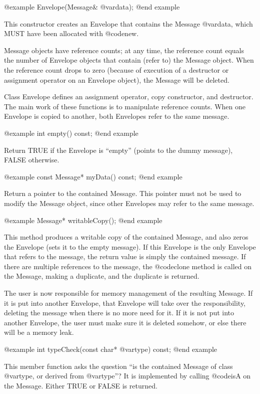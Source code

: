 @example
Envelope(Message& @var{data});
@end example

This constructor creates an Envelope that contains the Message
@var{data}, which MUST have been allocated with @code{new}.

Message objects have reference counts; at any time, the reference count
equals the number of Envelope objects that contain (refer to) the
Message object.  When the reference count drops to zero (because of
execution of a destructor or assignment operator on an Envelope object),
the Message will be deleted.

Class Envelope defines an assignment operator, copy constructor, and
destructor.  The main work of these functions is to manipulate reference
counts.  When one Envelope is copied to another, both Envelopes refer
to the same message.

@example
int empty() const;
@end example

Return TRUE if the Envelope is ``empty'' (points to the dummy message),
FALSE otherwise.

@example
const Message* myData() const;
@end example

Return a pointer to the contained Message.  This pointer must not be
used to modify the Message object, since other Envelopes may refer to
the same message.

@example
Message* writableCopy();
@end example

This method produces a writable copy of the contained Message, and
also zeros the Envelope (sets it to the empty message).  If this
Envelope is the only Envelope that refers to the message, the
return value is simply the contained message.  If there are multiple
references to the message, the @code{clone} method is called on the
Message, making a duplicate, and the duplicate is returned.

The user is now responsible for memory management of the resulting
Message.  If it is put into another Envelope, that Envelope will
take over the responsibility, deleting the message when there is
no more need for it.  If it is not put into another Envelope, the
user must make sure it is deleted somehow, or else there will be
a memory leak.

@example
int typeCheck(const char* @var{type}) const;
@end example

This member function asks the question ``is the contained Message
of class @var{type}, or derived from @var{type}''?  It is implemented by
calling @code{isA} on the Message.  Either TRUE or FALSE is returned.


